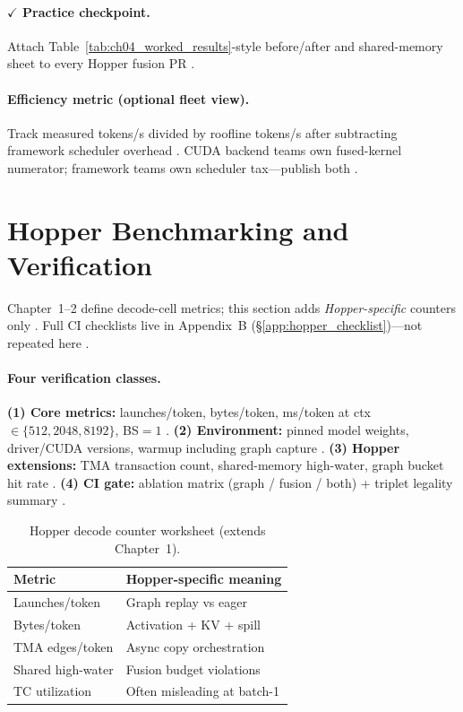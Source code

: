 \paragraph{$\checkmark$ Practice checkpoint.}
Attach Table~\ref{tab:ch04_worked_results}-style before/after and shared-memory sheet to every Hopper fusion PR \citep{taxbreak2026,memoryfloor2026}.

\paragraph{Efficiency metric (optional fleet view).}
Track measured tokens/s divided by roofline tokens/s after subtracting framework scheduler overhead \citep{patel2025llminference,memoryfloor2026,taxbreak2026}.
CUDA backend teams own fused-kernel numerator; framework teams own scheduler tax---publish both \citep{yirage2026,kwon2023vllm}.

\section{Hopper Benchmarking and Verification}
\label{sec:ch04_hopper_benchmark}

Chapter~1--2 define decode-cell metrics; this section adds \emph{Hopper-specific} counters only \citep{taxbreak2026,memoryfloor2026}.
Full CI checklists live in Appendix~B (\S\ref{app:hopper_checklist})---not repeated here \citep{yirage2026}.

\paragraph{Four verification classes.}
\textbf{(1) Core metrics:} launches/token, bytes/token, ms/token at ctx $\in\{512,2048,8192\}$, BS${=}1$ \citep{taxbreak2026,memoryfloor2026}.
\textbf{(2) Environment:} pinned model weights, driver/CUDA versions, warmup including graph capture \citep{nvidia2024cudagraphs,patel2025llminference}.
\textbf{(3) Hopper extensions:} TMA transaction count, shared-memory high-water, graph bucket hit rate \citep{semianalysis2024tma,nvidia2022hopper}.
\textbf{(4) CI gate:} ablation matrix (graph / fusion / both) + triplet legality summary \citep{yirage2026,amd2024xdna}.

\begin{table}[t]
\centering
\small
\caption{Hopper decode counter worksheet (extends Chapter~1).}
\label{tab:ch04_hopper_benchmark}
\begin{tabular}{@{}ll@{}}
\toprule
\textbf{Metric} & \textbf{Hopper-specific meaning} \\
\midrule
Launches/token & Graph replay vs eager \\
Bytes/token & Activation + KV + spill \\
TMA edges/token & Async copy orchestration \\
Shared high-water & Fusion budget violations \\
TC utilization & Often misleading at batch-1 \\
\bottomrule
\end{tabular}
\end{table}

